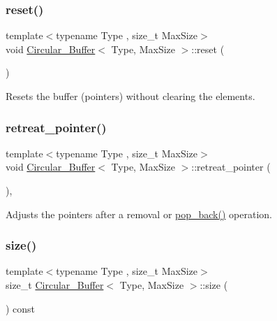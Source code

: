 \subsubsection{\texorpdfstring{reset()}{reset()}}
{\footnotesize\ttfamily template$<$typename Type , size\+\_\+t Max\+Size$>$ \\
void \hyperlink{classCircular__Buffer}{Circular\+\_\+\+Buffer}$<$ Type, Max\+Size $>$\+::reset (\begin{DoxyParamCaption}{ }\end{DoxyParamCaption})\hspace{0.3cm}{\ttfamily [inline]}}



Resets the buffer (pointers) without clearing the elements. 

\mbox{\label{classCircular__Buffer_a2b13869f0a5a4904142241a3d15ff141}} 
\subsubsection{\texorpdfstring{retreat\+\_\+pointer()}{retreat\_pointer()}}
{\footnotesize\ttfamily template$<$typename Type , size\+\_\+t Max\+Size$>$ \\
void \hyperlink{classCircular__Buffer}{Circular\+\_\+\+Buffer}$<$ Type, Max\+Size $>$\+::retreat\+\_\+pointer (\begin{DoxyParamCaption}{ }\end{DoxyParamCaption})\hspace{0.3cm}{\ttfamily [inline]}, {\ttfamily [private]}}



Adjusts the pointers after a removal or \hyperlink{classCircular__Buffer_a0b7b0fb1ecffc75ba233fed043616313}{pop\+\_\+back()} operation. 

\mbox{\label{classCircular__Buffer_a94a93c974e51a8a7ac9cefdfe896aaac}} 
\subsubsection{\texorpdfstring{size()}{size()}}
{\footnotesize\ttfamily template$<$typename Type , size\+\_\+t Max\+Size$>$ \\
size\+\_\+t \hyperlink{classCircular__Buffer}{Circular\+\_\+\+Buffer}$<$ Type, Max\+Size $>$\+::size (\begin{DoxyParamCaption}{ }\end{DoxyParamCaption}) const\hspace{0.3cm}{\ttfamily [inline]}}



